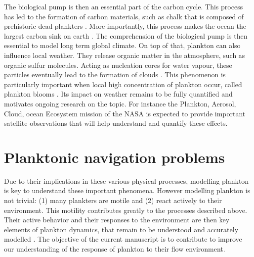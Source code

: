 The biological pump is then an essential part of the carbon cycle.
This process has led to the formation of carbon materials, such as chalk that is composed of prehistoric dead plankters \citep{farouk2020geochemical}.
More importantly, this process makes the ocean the largest carbon sink on earth \citep{lal2008carbon, hinge2020sustainability}.
The comprehension of the biological pump is then essential to model long term global climate. 
On top of that, plankton can also influence local weather.
They release organic matter in the atmosphere, such as organic sulfur molecules.
Acting as nucleation cores for water vapour, these particles eventually lead to the formation of clouds \citep{charlson1987oceanic, szyrmer1997biogenic}.
This phenomenon is particularly important when local high concentration of plankton occur, called plankton blooms \citep{behrenfeld2014resurrecting, park2017observational, creamean2019ice}.
Its impact on weather remains to be fully quantified \citep{quinn2011case} and motivates ongoing research on the topic.
For instance the Plankton, Aerosol, Cloud, ocean Ecosystem mission of the NASA \citep{werdell2019plankton} is expected to provide important satellite observations that will help understand and quantify these effects.

\section{Planktonic navigation problems}

Due to their implications in these various physical processes, modelling plankton is key to understand these important phenomena.
However modelling plankton is not trivial: (1) many plankters are motile and (2) react actively to their environment.
This motility contributes greatly to the processes described above.
Their active behavior and their responses to the environment are then key elements of plankton dynamics, that remain to be understood and accurately modelled \citep{franks2022oceanic}.
The objective of the current manuscript is to contribute to improve our understanding of the response of plankton to their flow environment. 

